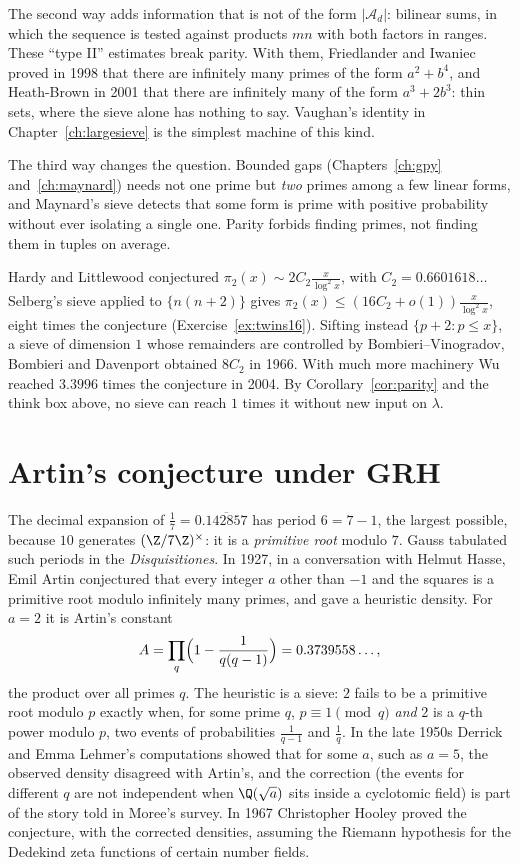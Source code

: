 The second way adds information that is not of the form $|\mathcal A_d|$: bilinear sums, in which the sequence is tested against products $mn$ with both factors in ranges. These ``type II'' estimates break parity. With them, Friedlander and Iwaniec proved in 1998 that there are infinitely many primes of the form $a^2+b^4$, and Heath-Brown in 2001 that there are infinitely many of the form $a^3+2b^3$: thin sets, where the sieve alone has nothing to say. Vaughan's identity in Chapter~\ref{ch:largesieve} is the simplest machine of this kind.

The third way changes the question. Bounded gaps (Chapters~\ref{ch:gpy} and~\ref{ch:maynard}) needs not one prime but \emph{two} primes among a few linear forms, and Maynard's sieve detects that some form is prime with positive probability without ever isolating a single one. Parity forbids finding primes, not finding them in tuples on average.

\begin{remark}
Hardy and Littlewood conjectured $\pi_2(x)\sim2C_2\frac x{\log^2x}$, with $C_2=0.6601618\ldots$ Selberg's sieve applied to $\{n(n+2)\}$ gives $\pi_2(x)\le(16C_2+o(1))\frac x{\log^2x}$, eight times the conjecture (Exercise~\ref{ex:twins16}). Sifting instead $\{p+2:p\le x\}$, a sieve of dimension $1$ whose remainders are controlled by Bombieri--Vinogradov, Bombieri and Davenport obtained $8C_2$ in 1966. With much more machinery Wu reached $3.3996$ times the conjecture in 2004. By Corollary~\ref{cor:parity} and the think box above, no sieve can reach $1$ times it without new input on $\lambda$.
\end{remark}

\section{Artin's conjecture under GRH}

The decimal expansion of $\frac17=0.\overline{142857}$ has period $6=7-1$, the largest possible, because $10$ generates $(\Z/7\Z)^\times$: it is a \emph{primitive root} modulo $7$. Gauss tabulated such periods in the \emph{Disquisitiones}. In 1927, in a conversation with Helmut Hasse, Emil Artin conjectured that every integer $a$ other than $-1$ and the squares is a primitive root modulo infinitely many primes, and gave a heuristic density. For $a=2$ it is Artin's constant
\[
A=\prod_q\Bigl(1-\frac1{q(q-1)}\Bigr)=0.3739558\ldots,
\]
the product over all primes $q$. The heuristic is a sieve: $2$ fails to be a primitive root modulo $p$ exactly when, for some prime $q$, $p\equiv1\pmod q$ \emph{and} $2$ is a $q$-th power modulo $p$, two events of probabilities $\frac1{q-1}$ and $\frac1q$. In the late 1950s Derrick and Emma Lehmer's computations showed that for some $a$, such as $a=5$, the observed density disagreed with Artin's, and the correction (the events for different $q$ are not independent when $\Q(\sqrt a)$ sits inside a cyclotomic field) is part of the story told in Moree's survey. In 1967 Christopher Hooley proved the conjecture, with the corrected densities, assuming the Riemann hypothesis for the Dedekind zeta functions of certain number fields.

